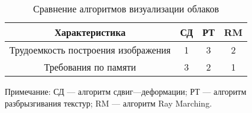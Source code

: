 \begin{table}[h]
	\begin{center}
		\begin{threeparttable}
			\captionsetup{justification=raggedright,singlelinecheck=off}
			\caption{Сравнение алгоритмов визуализации облаков}
			\label{tbl:rend_choice}
			\begin{tabular}{|c|c|c|c|}
				\hline
				Характеристика &  СД  & РТ & RM \\
				\hline
				Трудоемкость построения изображения &  1  & 3 & 2 \\
				\hline
				Требования по памяти & 3 & 2 & 1 \\
				\hline
			\end{tabular}
			\begin{tablenotes}
				\small
				\item Примечание:  СД --- алгоритм сдвиг---деформации; РТ --- алгоритм разбрызгивания текстур; RM --- алгоритм Ray Marching.
			\end{tablenotes}
		\end{threeparttable}
	\end{center}
\end{table}



